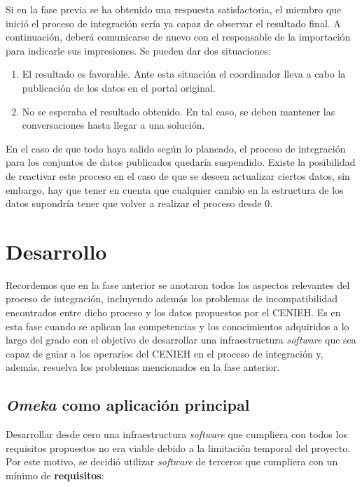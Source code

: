 \documentclass[
]{article}
\providecommand{\tightlist}{%
  \setlength{\itemsep}{0pt}\setlength{\parskip}{0pt}}
\begin{document}
Si en la fase previa se ha obtenido una respuesta satisfactoria, el
miembro que inició el proceso de integración sería ya capaz de observar
el resultado final. A continuación, deberá comunicarse de nuevo con el
responsable de la importación para indicarle sus impresiones. Se pueden
dar dos situaciones:

\begin{enumerate}
\def\labelenumi{\arabic{enumi}.}
\tightlist
\item
  El resultado es favorable. Ante esta situación el coordinador lleva a
  cabo la publicación de los datos en el portal original.
\item
  No se esperaba el resultado obtenido. En tal caso, se deben mantener
  las conversaciones hasta llegar a una solución.
\end{enumerate}

En el caso de que todo haya salido según lo planeado, el proceso de
integración para los conjuntos de datos publicados quedaría suspendido.
Existe la posibilidad de reactivar este proceso en el caso de que se
deseen actualizar ciertos datos, sin embargo, hay que tener en cuenta
que cualquier cambio en la estructura de los datos supondría tener que
volver a realizar el proceso desde 0.

\hypertarget{desarrollo}{%
\section{Desarrollo}\label{desarrollo}}

Recordemos que en la fase anterior se anotaron todos los aspectos
relevantes del proceso de integración, incluyendo además los problemas
de incompatibilidad encontrados entre dicho proceso y los datos
propuestos por el CENIEH. Es en esta fase cuando se aplican las
competencias y los conocimientos adquiridos a lo largo del grado con el
objetivo de desarrollar una infraestructura \emph{software} que sea
capaz de guiar a los operarios del CENIEH en el proceso de integración
y, además, resuelva los problemas mencionados en la fase anterior.

\hypertarget{omeka-como-aplicaciuxf3n-principal}{%
\subsection{\texorpdfstring{\emph{Omeka} como aplicación
principal}{Omeka como aplicación principal}}\label{omeka-como-aplicaciuxf3n-principal}}

Desarrollar desde cero una infraestructura \emph{software} que cumpliera
con todos los requisitos propuestos no era viable debido a la limitación
temporal del proyecto. Por este motivo, se decidió utilizar
\emph{software} de terceros que cumpliera con un mínimo de
\textbf{requisitos}:
\end{document}
